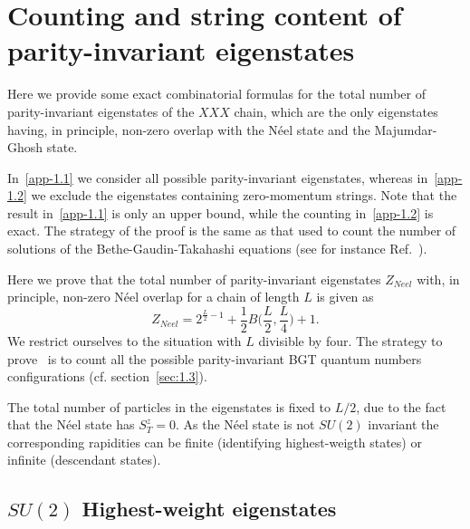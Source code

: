 \documentclass[11pt]{iopart}
\begin{document}
\section{Counting and string content of parity-invariant eigenstates}
\label{app-1}

Here we provide some exact combinatorial formulas for the total number of 
parity-invariant eigenstates of the $XXX$ chain, which are the only eigenstates 
having, in principle, non-zero overlap with the N\'eel state and the 
Majumdar-Ghosh state. 

In~\ref{app-1.1} we consider all possible parity-invariant 
eigenstates, whereas in~\ref{app-1.2} we exclude the eigenstates containing 
zero-momentum strings. Note that the result in~\ref{app-1.1} is only an upper 
bound, while the counting in~\ref{app-1.2} is exact. The strategy of the proof 
is the same as that used to count the number of solutions of the 
Bethe-Gaudin-Takahashi equations (see for instance Ref.~\cite{faddeev-1996}). 


Here we prove that the total number of parity-invariant eigenstates $Z_{Neel}$ 
with, in principle, non-zero N\'eel overlap for a chain of length $L$ is given 
as 
%
\begin{equation}
\label{N-count}
Z_{Neel}=2^{\frac{L}{2}-1}+\frac{1}{2}B\Big(\frac{L}{2},\frac{L}{4}\Big)+1. 
\end{equation}
%
We restrict ourselves to the situation with $L$ divisible by four. The strategy to 
prove~ is to count all the possible parity-invariant BGT quantum numbers 
configurations (cf. section~\ref{sec:1.3}). 

The total number of particles in the eigenstates is fixed to $L/2$, due to the fact that 
the N\'eel state has $S_T^z=0$. As the N\'eel state is not $SU(2)$ invariant the corresponding 
rapidities can be finite (identifying highest-weigth states) or infinite (descendant states). 

\subsection{$SU(2)$ Highest-weight eigenstates}
\end{document}
